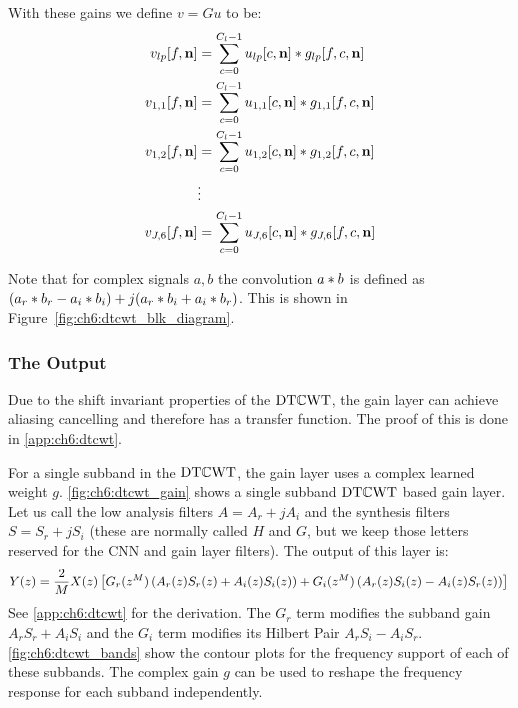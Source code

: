 With these gains we define $v = Gu$ to be:
\begin{align}
  v_{lp}[f, \mathbf{n}] &=  \sum_{c=0}^{C_l-1} u_{lp}[c, \mathbf{n}] \ast g_{lp}[f, c, \mathbf{n}] \\
  v_{1,1}[f, \mathbf{n}] &=  \sum_{c=0}^{C_l-1} u_{1,1}[c, \mathbf{n}] \ast g_{1,1}[f, c, \mathbf{n}] \\
  v_{1,2}[f, \mathbf{n}] &=  \sum_{c=0}^{C_l-1} u_{1,2}[c, \mathbf{n}] \ast g_{1,2}[f, c, \mathbf{n}] \\
                  & \vdots \nonumber \\
  v_{J,6}[f, \mathbf{n}] &=  \sum_{c=0}^{C_l-1} u_{J,6}[c, \mathbf{n}] \ast g_{J,6}[f, c, \mathbf{n}] 
\end{align}

Note that for complex signals $a, b$ the convolution $a \ast b$ is defined as $(a_r \ast
b_r - a_i \ast b_i) + j(a_r \ast b_i + a_i \ast b_r)$. This is shown 
in Figure~\autoref{fig:ch6:dtcwt_blk_diagram}.

\subsubsection{The Output}
Due to the shift invariant properties of the $\mathrm{DT}\mathbb{C}\mathrm{WT}$, the gain layer can achieve aliasing
cancelling and therefore has a transfer function. The proof of this is done in
\autoref{app:ch6:dtcwt}. 

\begin{figure}[ht!]
  \centering
  
  \label{fig:ch6:dtcwt_gain}
\end{figure}

For a single subband in the $\mathrm{DT}\mathbb{C}\mathrm{WT}$, the gain layer uses a complex learned
weight $g$. \autoref{fig:ch6:dtcwt_gain} shows a single subband $\mathrm{DT}\mathbb{C}\mathrm{WT}$
based gain layer. 
Let us call the low analysis filters $A = A_r + jA_i$ and 
the synthesis filters $S = S_r + jS_i$ (these are normally called $H$ and
$G$, but we keep those letters reserved for the CNN and gain layer filters). 
The output of this layer is:
\begin{equation}\label{eq:ch6:dtcwt_fwd}
  Y(z) = \frac{2}{M}X(z) \left[G_r(z^{M}) \left(A_r(z)S_r(z) + A_i(z)S_i(z)\right)
  + G_i(z^{M}) \left(A_r(z)S_i(z) - A_i(z)S_r(z)\right) \right] \\
\end{equation}
See \autoref{app:ch6:dtcwt} for the derivation. The $G_r$ term modifies the
subband gain $A_rS_r + A_iS_i$ and the $G_i$ term modifies its Hilbert Pair
$A_rS_i - A_iS_r$. \autoref{fig:ch6:dtcwt_bands} show the contour plots for the
frequency support of each of these subbands. The complex gain $g$ can be used to
reshape the frequency response for each subband independently.

